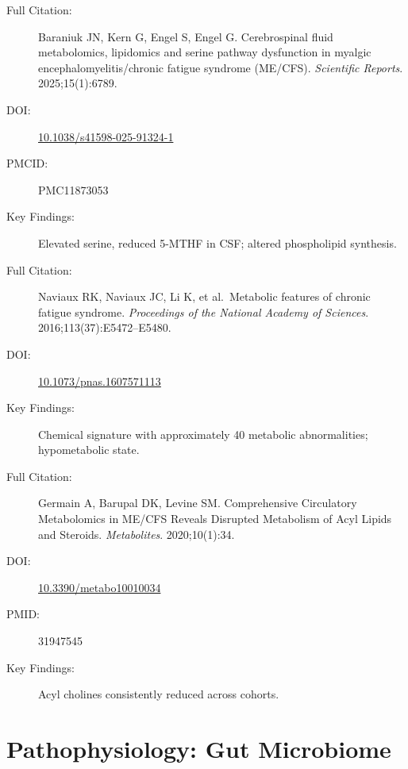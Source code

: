 \begin{description}
    \item[Full Citation:] Baraniuk JN, Kern G, Engel S, Engel G. Cerebrospinal fluid metabolomics, lipidomics and serine pathway dysfunction in myalgic encephalomyelitis/chronic fatigue syndrome (ME/CFS). \textit{Scientific Reports}. 2025;15(1):6789.
    \item[DOI:] \href{https://doi.org/10.1038/s41598-025-91324-1}{10.1038/s41598-025-91324-1}
    \item[PMCID:] PMC11873053
    \item[Key Findings:] Elevated serine, reduced 5-MTHF in CSF; altered phospholipid synthesis.
\end{description}

\begin{description}
    \item[Full Citation:] Naviaux RK, Naviaux JC, Li K, et al.\ Metabolic features of chronic fatigue syndrome. \textit{Proceedings of the National Academy of Sciences}. 2016;113(37):E5472--E5480.
    \item[DOI:] \href{https://doi.org/10.1073/pnas.1607571113}{10.1073/pnas.1607571113}
    \item[Key Findings:] Chemical signature with approximately 40 metabolic abnormalities; hypometabolic state.
\end{description}

\begin{description}
    \item[Full Citation:] Germain A, Barupal DK, Levine SM. Comprehensive Circulatory Metabolomics in ME/CFS Reveals Disrupted Metabolism of Acyl Lipids and Steroids. \textit{Metabolites}. 2020;10(1):34.
    \item[DOI:] \href{https://doi.org/10.3390/metabo10010034}{10.3390/metabo10010034}
    \item[PMID:] 31947545
    \item[Key Findings:] Acyl cholines consistently reduced across cohorts.
\end{description}

\section{Pathophysiology: Gut Microbiome}
\label{sec:bib-microbiome}

